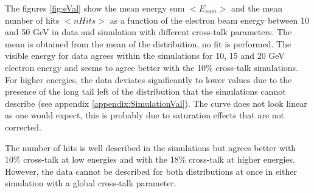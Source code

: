 The figures \ref{fig:eVal} show the mean energy sum $<E_{sum}>$ and the mean number of hits $<nHits>$ as a function of the electron beam energy between 10 and 50 GeV in data and simulation with different cross-talk parameters. The mean is obtained from the mean of the distribution, no fit is performed. The visible energy for data agrees within the simulations for 10, 15 and 20 GeV electron energy and seems to agree better with the 10\% cross-talk simulations. For higher energies, the data deviates significantly to lower values due to the presence of the long tail left of the distribution that the simulations cannot describe (see appendix \ref{appendix:SimulationVal}). The curve does not look linear as one would expect, this is probably due to saturation effects that are not corrected.

The number of hits is well described in the simulations but agrees better with 10\% cross-talk at low energies and with the 18\% cross-talk at higher energies. However, the data cannot be described for both distributions at once in either simulation with a global cross-talk parameter.

